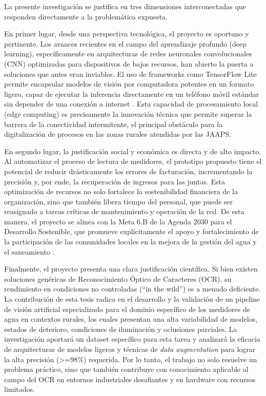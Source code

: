 La presente investigación se justifica en tres dimensiones interconectadas que responden directamente a la problemática expuesta.

En primer lugar, desde una perspectiva tecnológica, el proyecto es oportuno y pertinente. Los avances recientes en el campo del aprendizaje profundo (deep learning), específicamente en arquitecturas de redes neuronales convolucionales (CNN) optimizadas para dispositivos de bajos recursos, han abierto la puerta a soluciones que antes eran inviables. El uso de frameworks como TensorFlow Lite permite encapsular modelos de visión por computadora potentes en un formato ligero, capaz de ejecutar la inferencia directamente en un teléfono móvil estándar sin depender de una conexión a internet \parencite{Carvalho2023}. Esta capacidad de procesamiento local (edge computing) es precisamente la innovación técnica que permite superar la barrera de la conectividad intermitente, el principal obstáculo para la digitalización de procesos en las zonas rurales atendidas por las JAAPS.

En segundo lugar, la justificación social y económica es directa y de alto impacto. Al automatizar el proceso de lectura de medidores, el prototipo propuesto tiene el potencial de reducir drásticamente los errores de facturación, incrementando la precisión y, por ende, la recuperación de ingresos para las juntas. Esta optimización de recursos no solo fortalece la sostenibilidad financiera de la organización, sino que también libera tiempo del personal, que puede ser reasignado a tareas críticas de mantenimiento y operación de la red. De esta manera, el proyecto se alinea con la Meta 6.B de la Agenda 2030 para el Desarrollo Sostenible, que promueve explícitamente el apoyo y fortalecimiento de la participación de las comunidades locales en la mejora de la gestión del agua y el saneamiento \parencite{NacionesUnidas2015}.

Finalmente, el proyecto presenta una clara justificación científica. Si bien existen soluciones genéricas de Reconocimiento Óptico de Caracteres (OCR), su rendimiento en condiciones no controladas (``in the wild'') es a menudo deficiente. La contribución de esta tesis radica en el desarrollo y la validación de un pipeline de visión artificial especializado para el dominio específico de los medidores de agua en contextos rurales, los cuales presentan una alta variabilidad de modelos, estados de deterioro, condiciones de iluminación y oclusiones parciales. La investigación aportará un dataset específico para esta tarea y analizará la eficacia de arquitecturas de modelos ligeros y técnicas de \textit{data augmentation} para lograr la alta precisión (\textgreater=98\%) requerida. Por lo tanto, el trabajo no solo resuelve un problema práctico, sino que también contribuye con conocimiento aplicable al campo del OCR en entornos industriales desafiantes y en hardware con recursos limitados.

